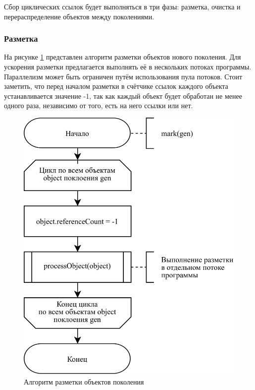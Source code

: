 Сбор циклических ссылок будет выполняться в три фазы: разметка, очистка и перераспределение объектов между поколениями.

\subsubsection{Разметка}

На рисунке \ref{fig:mark-1} представлен алгоритм разметки объектов нового поколения. Для ускорения разметки предлагается выполнять её в нескольких потоках программы. Параллелизм может быть ограничен путём использования пула потоков. Стоит заметить, что перед началом разметки в счётчике ссылок каждого объекта устанавливается значение -1, так как каждый объект будет обработан не менее одного раза, независимо от того, есть на него ссылки или нет.

\begin{figure}[H]
	\centering
	\includegraphics[scale=0.185]{assets/mark-1.png}
	\caption{Алгоритм разметки объектов поколения}
	\label{fig:mark-1}
\end{figure}

